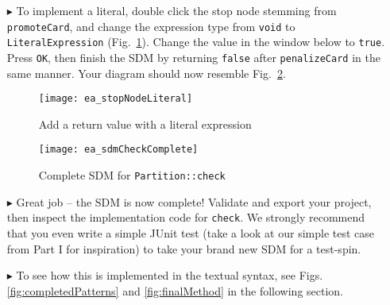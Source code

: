 \begin{itemize}
\vspace{0.5cm}

\item[$\blacktriangleright$] To implement a literal, double click the stop node stemming from  \texttt{promoteCard}, and change the expression type from
\texttt{void} to \texttt{LiteralEx\-pression} (Fig.~\ref{fig:sdm_check_literal_exp}). Change the value in the window below to \texttt{true}. Press \texttt{OK},
then finish the SDM by returning \texttt{false} after \texttt{penalizeCard} in the same manner. Your diagram should now resemble
Fig.~\ref{fig:sdm_check_finish}.

\begin{figure}[htbp]
\begin{center}
  \texttt{[image: ea\_stopNodeLiteral]}
  \caption{Add a return value with a literal expression}
  \label{fig:sdm_check_literal_exp}
\end{center}
\end{figure}

\begin{figure}[htbp]
\begin{center}
  \texttt{[image: ea\_sdmCheckComplete]}
  \caption{Complete SDM for \texttt{Partition::check}}
  \label{fig:sdm_check_finish}
\end{center}
\end{figure}

\clearpage

\item[$\blacktriangleright$] Great job -- the SDM is now complete! Validate and export your project, then inspect the implementation code for \texttt{check}. We
strongly recommend that you even write a simple JUnit test (take a look at our simple test case from Part I for inspiration) to take your brand new SDM for a
test-spin.

\item[$\blacktriangleright$] To see how this is implemented in the textual syntax, see Figs. \ref{fig:completedPatterns} and \ref{fig:finalMethod} in the
following section.


\end{itemize}
